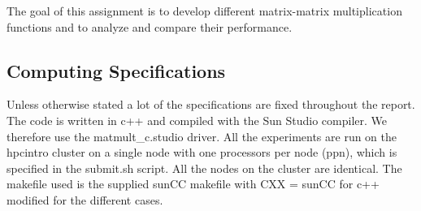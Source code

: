 The goal of this assignment is to develop different matrix-matrix multiplication functions and to analyze and compare their performance.

\subsection{Computing Specifications}
Unless otherwise stated a lot of the specifications are fixed throughout the report. The code is written in c++ and compiled with the Sun Studio compiler. We therefore use the matmult\_c.studio driver. All the experiments are run on the hpcintro cluster on a single node with one processors per node (ppn), which is specified in the submit.sh script. All the nodes on the cluster are identical. The makefile used is the supplied sunCC makefile with CXX = sunCC for c++ modified for the different cases.

